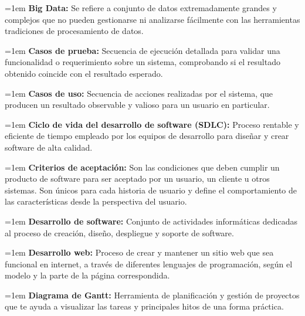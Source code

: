 \documentclass[12pt,letterpaper,spanish, xcolor=table]{report}
\numberwithin{figure}{subsection}
\begin{document}
	
	{\leftskip=1em 
		\noindent 
		\textbf{Big Data: } Se refiere a conjunto de datos extremadamente grandes y complejos que no pueden gestionarse ni analizarse fácilmente con las herramientas tradiciones de procesamiento de datos. \\
	\par}
	
	
	{\leftskip=1em 
		\noindent 
		\textbf{Casos de prueba:} Secuencia de ejecución detallada para validar una funcionalidad o requerimiento sobre un sistema, comprobando si el resultado obtenido coincide con el resultado esperado. \\
	\par}
	
	{\leftskip=1em 
		\noindent 
		\textbf{Casos de uso:} Secuencia de acciones realizadas por el sistema, que producen un resultado observable y valioso para un usuario en particular. \\
	\par}
	
	
	{\leftskip=1em 
		\noindent 
		\textbf{Ciclo de vida del desarrollo de software (SDLC):} Proceso rentable y eficiente de tiempo empleado por los equipos de desarrollo para diseñar y crear software de alta calidad. \\
	\par}
	
	
	{\leftskip=1em 
		\noindent 
		\textbf{Criterios de aceptación:} Son las condiciones que deben cumplir un producto de software para ser aceptado por un usuario, un cliente u otros sistemas. Son únicos para cada historia de usuario y define el comportamiento de las características desde la perspectiva del usuario.\\
	\par}
	
	
	{\leftskip=1em 
		\noindent 
		\textbf{Desarrollo de software:} Conjunto de actividades informáticas dedicadas al proceso de creación, diseño, despliegue y soporte de software. \\
	\par}
	
	
	{\leftskip=1em 
		\noindent 
		\textbf{Desarrollo web:} Proceso de crear y mantener un sitio web que sea funcional en internet, a través de diferentes lenguajes de programación, según el modelo y la parte de la página correspondida.\\ 
	\par}
	
	
	{\leftskip=1em 
		\noindent 
		\textbf{Diagrama de Gantt:} Herramienta de planificación y gestión de proyectos que te ayuda a visualizar las tareas y principales hitos de una forma práctica. \\
	\par}
	
\end{document}
